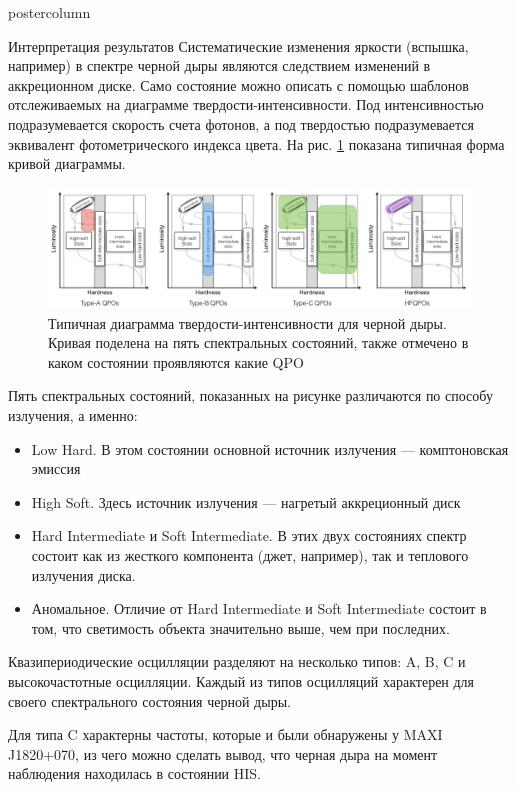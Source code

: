 \documentclass{beamer}
\begin{document}
\begin{frame}
\begin{columns}
\begin{column}{.57\textwidth}
\begin{beamercolorbox}[center]{postercolumn}
\begin{minipage}{.98\textwidth}
{\begin{myblock}{Интерпретация результатов}
						Систематические изменения яркости (вспышка, например) в спектре черной дыры являются следствием  изменений в аккреционном диске. Само состояние можно описать с помощью шаблонов отслеживаемых на диаграмме твердости-интенсивности. Под интенсивностью подразумевается скорость счета фотонов, а под твердостью подразумевается эквивалент фотометрического индекса цвета. На рис. \ref{img:sz} показана типичная форма кривой диаграммы.
							\begin{figure}[h!]
								\centering
								\includegraphics[width = \linewidth]{pictures/HID.png}
								\caption{Типичная диаграмма твердости-интенсивности для черной дыры. Кривая поделена на пять спектральных состояний, также отмечено в каком состоянии проявляются какие QPO}
								\label{img:sz}
							\end{figure}
	
							Пять спектральных состояний, показанных на рисунке различаются по способу излучения, а именно:
	
							\begin{itemize}
								\item 	Low Hard. В этом состоянии основной источник излучения --- комптоновская эмиссия
								\item High Soft. Здесь источник излучения --- нагретый аккреционный диск
								\item Hard Intermediate и Soft Intermediate. В этих двух состояниях спектр состоит как из жесткого компонента (джет, например), так и теплового излучения диска.
								\item Аномальное. Отличие от Hard Intermediate и Soft Intermediate состоит в том, что светимость объекта значительно выше, чем при последних. 
							\end{itemize}
	
							Квазипериодические осцилляции разделяют на несколько типов: A, B, C и высокочастотные осцилляции. Каждый из типов осцилляций характерен для своего спектрального состояния черной дыры.
							
							Для типа C характерны частоты, которые и были обнаружены у MAXI J1820+070, из чего можно сделать вывод, что черная дыра на момент наблюдения находилась в состоянии HIS.
						
					\end{myblock}\vfill
		}\end{minipage}\end{beamercolorbox}
	\end{column}
\end{columns}
\end{frame}
\end{document}

